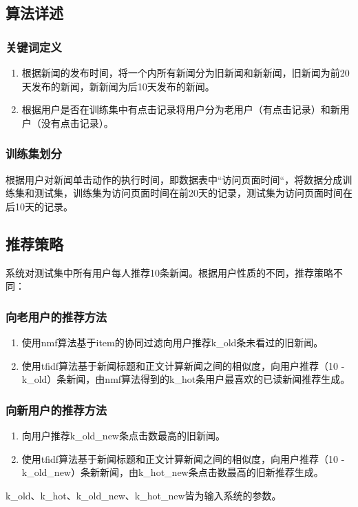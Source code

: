 \documentclass[UTF8]{article}
\begin{document}
\subsection{算法详述}
\subsubsection{关键词定义}
\begin{enumerate}
	\item 根据新闻的发布时间，将一个内所有新闻分为旧新闻和新新闻，旧新闻为前20天发布的新闻，新新闻为后10天发布的新闻。
	\item 根据用户是否在训练集中有点击记录将用户分为老用户（有点击记录）和新用户（没有点击记录）。
\end{enumerate}
\subsubsection{训练集划分}
根据用户对新闻单击动作的执行时间，即数据表中“访问页面时间“，将数据分成训练集和测试集，训练集为访问页面时间在前20天的记录，测试集为访问页面时间在后10天的记录。
\subsection{推荐策略}
系统对测试集中所有用户每人推荐10条新闻。根据用户性质的不同，推荐策略不同：
\subsubsection{向老用户的推荐方法}
\begin{enumerate}
	\item 使用nmf算法基于item的协同过滤向用户推荐k\_old条未看过的旧新闻。
	\item 使用tfidf算法基于新闻标题和正文计算新闻之间的相似度，向用户推荐（10 - k\_old）条新闻，由nmf算法得到的k\_hot条用户最喜欢的已读新闻推荐生成。
\end{enumerate}
\subsubsection{向新用户的推荐方法}
\begin{enumerate}
	\item 向用户推荐k\_old\_new条点击数最高的旧新闻。
	\item 使用tfidf算法基于新闻标题和正文计算新闻之间的相似度，向用户推荐（10 - k\_old\_new）条新新闻，由k\_hot\_new条点击数最高的旧新推荐生成。
\end{enumerate}
k\_old、k\_hot、k\_old\_new、k\_hot\_new皆为输入系统的参数。
\end{document}
